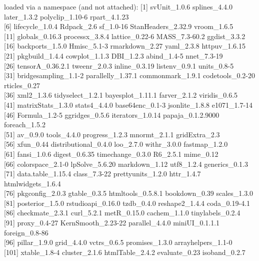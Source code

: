\documentclass[preprint]{JASA}
\begin{document}
loaded via a namespace (and not attached):
{[}1{]} svUnit\_1.0.6 splines\_4.4.0 later\_1.3.2 polyclip\_1.10-6 rpart\_4.1.23\\
{[}6{]} lifecycle\_1.0.4 Rdpack\_2.6 sf\_1.0-16 StanHeaders\_2.32.9 vroom\_1.6.5\\
{[}11{]} globals\_0.16.3 processx\_3.8.4 lattice\_0.22-6 MASS\_7.3-60.2 ggdist\_3.3.2\\
{[}16{]} backports\_1.5.0 Hmisc\_5.1-3 rmarkdown\_2.27 yaml\_2.3.8 httpuv\_1.6.15\\
{[}21{]} pkgbuild\_1.4.4 cowplot\_1.1.3 DBI\_1.2.3 abind\_1.4-5 nnet\_7.3-19\\
{[}26{]} tensorA\_0.36.2.1 tweenr\_2.0.3 inline\_0.3.19 listenv\_0.9.1 units\_0.8-5\\
{[}31{]} bridgesampling\_1.1-2 parallelly\_1.37.1 commonmark\_1.9.1 codetools\_0.2-20 rticles\_0.27\\
{[}36{]} xml2\_1.3.6 tidyselect\_1.2.1 bayesplot\_1.11.1 farver\_2.1.2 viridis\_0.6.5\\
{[}41{]} matrixStats\_1.3.0 stats4\_4.4.0 base64enc\_0.1-3 jsonlite\_1.8.8 e1071\_1.7-14\\
{[}46{]} Formula\_1.2-5 ggridges\_0.5.6 iterators\_1.0.14 papaja\_0.1.2.9000 foreach\_1.5.2\\
{[}51{]} av\_0.9.0 tools\_4.4.0 progress\_1.2.3 mnormt\_2.1.1 gridExtra\_2.3\\
{[}56{]} xfun\_0.44 distributional\_0.4.0 loo\_2.7.0 withr\_3.0.0 fastmap\_1.2.0\\
{[}61{]} fansi\_1.0.6 digest\_0.6.35 timechange\_0.3.0 R6\_2.5.1 mime\_0.12\\
{[}66{]} colorspace\_2.1-0 lpSolve\_5.6.20 markdown\_1.12 utf8\_1.2.4 generics\_0.1.3\\
{[}71{]} data.table\_1.15.4 class\_7.3-22 prettyunits\_1.2.0 httr\_1.4.7 htmlwidgets\_1.6.4\\
{[}76{]} pkgconfig\_2.0.3 gtable\_0.3.5 htmltools\_0.5.8.1 bookdown\_0.39 scales\_1.3.0\\
{[}81{]} posterior\_1.5.0 rstudioapi\_0.16.0 tzdb\_0.4.0 reshape2\_1.4.4 coda\_0.19-4.1\\
{[}86{]} checkmate\_2.3.1 curl\_5.2.1 metR\_0.15.0 cachem\_1.1.0 tinylabels\_0.2.4\\
{[}91{]} proxy\_0.4-27 KernSmooth\_2.23-22 parallel\_4.4.0 miniUI\_0.1.1.1 foreign\_0.8-86\\
{[}96{]} pillar\_1.9.0 grid\_4.4.0 vctrs\_0.6.5 promises\_1.3.0 arrayhelpers\_1.1-0\\
{[}101{]} xtable\_1.8-4 cluster\_2.1.6 htmlTable\_2.4.2 evaluate\_0.23 isoband\_0.2.7\\
\end{document}
